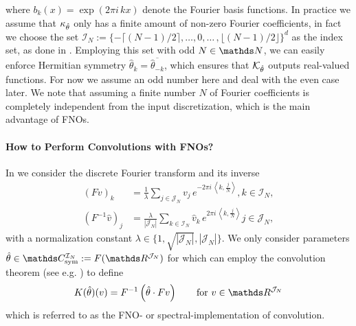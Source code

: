 %
where $b_k(x) = \exp{(2\pi i\, kx)}$ denote the Fourier basis functions. In practice we assume that $\kappa_{\hat{\theta}}$ only has a finite amount of non-zero Fourier coefficients, in fact we choose the set $\mathcal{I}_N := \lbrace -\lceil (N-1)/2\rceil, \ldots,0, \ldots\,, \lfloor (N-1)/2 \rfloor\rbrace^d$ as the index set, as done in \cite{li2020fourier}. Employing this set with odd $N\in\N$, we can easily enforce Hermitian symmetry $\hat{\theta}_k = \overline{\hat{\theta}_{-k}}$, which ensures that $\mathcal{K}_{\hat{\theta}}$ outputs real-valued functions. For now we assume an odd number here and deal with the even case later. We note that assuming a finite number $N$ of Fourier coefficients is completely independent from the input discretization, which is the main advantage of FNOs.
%
%
\paragraph{How to Perform Convolutions with FNOs?}
%
%
In \cite{kabri2023resolution} we consider the discrete Fourier transform and its inverse
%
\begin{align*}
\left(Fv\right)_k &= \frac{1}{\lambda} \sum_{j \in \mathcal{J}_N} v_j\, e^{-2\pi i \, \left\langle k, \frac{j}{N}\right\rangle},  k \in \mathcal{I}_N,\\
%
\left(F^{-1}\hat{v}\right)_j &= \frac{\lambda}{|\mathcal{J}_N|}\sum_{k \in \mathcal{I}_N} \hat{v}_k\, e^{2\pi i \, \left\langle k, \frac{j}{N}\right\rangle} j \in \mathcal{J}_N,
\end{align*}
%
with a normalization constant $\lambda \in \{1, \sqrt{|\mathcal{J}_N|}, |\mathcal{J}_N|\}$. We only consider parameters $\hat\param\in \Csym^{\mathcal{I}_N} := F(\R^{\mathcal{J}_N})$ for which can employ the convolution theorem (see e.g. \cite{grafakos}) to define
%
\begin{align}\label{eq:discfno}
K(\hat{\theta})(v) = F^{-1}\left(\hat{\theta} \cdot Fv\right) \qquad \text{for }v \in \R^{\mathcal{J}_N}
\end{align}
%
which is referred to as the FNO- or spectral-implementation of convolution.
%
%
